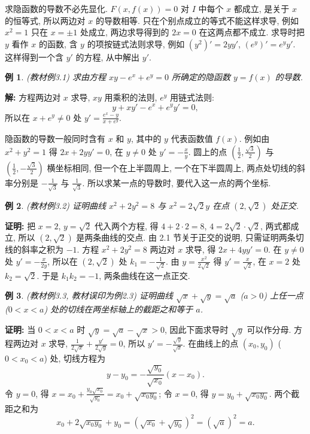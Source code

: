 \documentclass[UTF8,openany]{ctexbook}
\theoremstyle{chinesetextbook}
\newtheorem{example}{例}[section]
\newenvironment{cnproof}{\par\indent\textbf{证明:} \ignorespaces}{\par}
\newenvironment{cnsolution}{\par\indent\textbf{解:} \ignorespaces}{\par}
\begin{document}
求隐函数的导数不必先显化. $F(x,f(x))=0$ 对 $I$ 中每个 $x$ 都成立, 是关于 $x$ 的恒等式, 所以两边对 $x$ 的导数相等. 只在个别点成立的等式不能这样求导, 例如 $x^2=1$ 只在 $x=\pm1$ 处成立, 两边求导得到的 $2x=0$ 在这两点都不成立. 求导时把 $y$ 看作 $x$ 的函数, 含 $y$ 的项按链式法则求导, 例如 $(y^2)'=2yy'$, $(e^y)'=e^yy'$. 这样得到一个含 $y'$ 的方程, 从中解出 $y'$.
\begin{example}\label{ex:c2-3-1}
\textnormal{(教材例3.1)} 求由方程 $xy-e^x+e^y=0$ 所确定的隐函数 $y=f(x)$ 的导数.
\end{example}
\begin{cnsolution}
方程两边对 $x$ 求导, $xy$ 用乘积的法则, $e^y$ 用链式法则:
\[
y+xy'-e^x+e^yy'=0,
\]
所以在 $x+e^y\ne0$ 处 $\displaystyle y'=\frac{e^x-y}{x+e^y}$.
\end{cnsolution}
隐函数的导数一般同时含有 $x$ 和 $y$, 其中的 $y$ 代表函数值 $f(x)$. 例如由 $x^2+y^2=1$ 得 $2x+2yy'=0$, 在 $y\ne0$ 处 $\displaystyle y'=-\frac xy$. 圆上的点 $\displaystyle\left(\frac12,\frac{\sqrt3}2\right)$ 与 $\displaystyle\left(\frac12,-\frac{\sqrt3}2\right)$ 横坐标相同, 但一个在上半圆周上, 一个在下半圆周上, 两点处切线的斜率分别是 $\displaystyle-\frac1{\sqrt3}$ 与 $\displaystyle\frac1{\sqrt3}$. 所以求某一点的导数时, 要代入这一点的两个坐标.
\begin{example}\label{ex:c2-3-2}
\textnormal{(教材例3.2)} 证明曲线 $x^2+2y^2=8$ 与 $x^2=2\sqrt2y$ 在点 $(2,\sqrt2)$ 处正交.
\end{example}
\begin{cnproof}
把 $x=2$, $y=\sqrt2$ 代入两个方程, 得 $4+2\cdot2=8$, $4=2\sqrt2\cdot\sqrt2$, 两式都成立, 所以 $(2,\sqrt2)$ 是两条曲线的交点. 由 2.1 节关于正交的说明, 只需证明两条切线的斜率之积为 $-1$. 方程 $x^2+2y^2=8$ 两边对 $x$ 求导, 得 $2x+4yy'=0$. 在 $y\ne0$ 处 $\displaystyle y'=-\frac x{2y}$, 所以在 $(2,\sqrt2)$ 处 $\displaystyle k_1=-\frac1{\sqrt2}$. 由 $\displaystyle y=\frac{x^2}{2\sqrt2}$ 得 $\displaystyle y'=\frac x{\sqrt2}$, 在 $x=2$ 处 $k_2=\sqrt2$. 于是 $k_1k_2=-1$, 两条曲线在这一点正交.
\end{cnproof}
\begin{example}\label{ex:c2-3-3}
\textnormal{(教材例3.3, 教材误印为例2.3)} 证明曲线 $\sqrt x+\sqrt y=\sqrt a$ ($a>0$) 上任一点 ($0<x<a$) 处的切线在两坐标轴上的截距之和等于 $a$.
\end{example}
\begin{cnproof}
当 $0<x<a$ 时 $\sqrt y=\sqrt a-\sqrt x>0$, 因此下面求导时 $\sqrt y$ 可以作分母. 方程两边对 $x$ 求导, $\displaystyle\frac1{2\sqrt x}+\frac{y'}{2\sqrt y}=0$, 所以 $\displaystyle y'=-\frac{\sqrt y}{\sqrt x}$. 在曲线上的点 $(x_0,y_0)$ ($0<x_0<a$) 处, 切线方程为
\[
y-y_0=-\frac{\sqrt{y_0}}{\sqrt{x_0}}(x-x_0).
\]
令 $y=0$, 得 $\displaystyle x=x_0+\frac{y_0\sqrt{x_0}}{\sqrt{y_0}}=x_0+\sqrt{x_0y_0}$; 令 $x=0$, 得 $y=y_0+\sqrt{x_0y_0}$. 两个截距之和为
\[
x_0+2\sqrt{x_0y_0}+y_0=\left(\sqrt{x_0}+\sqrt{y_0}\right)^2=\left(\sqrt a\right)^2=a.
\]
\end{cnproof}
\end{document}
